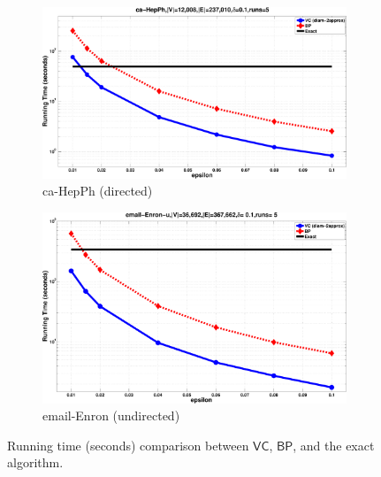 \begin{figure}[ht]
  \begin{subfigure}[b]{0.49\textwidth}
    \includegraphics[width=\textwidth]{centrsampl/figures/eps/ca-HepPh-time}
    \caption{ca-HepPh (directed)}
    \label{fig:centrsamplHepPh:time}
  \end{subfigure}
  \fi
  \hfill
  \begin{subfigure}[b]{0.49\textwidth}
    \includegraphics[width=\textwidth]{centrsampl/figures/eps/email-Enron-time}
    \caption{email-Enron (undirected)}
    \label{fig:centrsamplemail:time}
  \end{subfigure}
  \caption{Running time (seconds) comparison between $\mathsf{VC}$, $\mathsf{BP}$, and the
  exact algorithm.}
  \label{fig:centrsampltime}
\end{figure}

